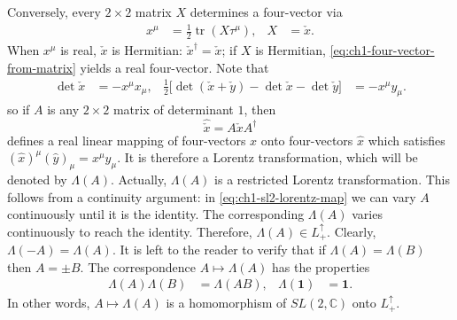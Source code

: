 Conversely, every $2\times2$ matrix $X$ determines a four-vector via
\begin{equation}
\begin{aligned}
  x^\mu&=\frac12\operatorname{tr}(X\tau^\mu),
  & X&=\check{x}.
\end{aligned}
  \tag{1-12}\label{eq:ch1-four-vector-from-matrix}
\end{equation}
When $x^\mu$ is real, $\check{x}$ is Hermitian:
$\check{x}^{\dagger}=\check{x}$; if $X$ is Hermitian, \eqref{eq:ch1-four-vector-from-matrix} yields a real
four-vector. Note that
\begin{equation}
\begin{aligned}
  \det\check{x}&=-x^\mu x_\mu,
  &
  \frac12\bigl[\det(\check{x}+\check{y})-\det\check{x}-\det\check{y}\bigr]
  &=-x^\mu y_\mu .
\end{aligned}
  \tag{1-13}\label{eq:ch1-determinant-polarization}
\end{equation}
so if $A$ is any $2\times2$ matrix of determinant $1$, then
\begin{equation}
  \widehat{\check{x}}=A\check{x}A^\dagger
  \tag{1-14}\label{eq:ch1-sl2-lorentz-map}
\end{equation}
defines a real linear mapping of four-vectors $x$ onto four-vectors
$\widehat{x}$ which satisfies
$(\widehat{x})^\mu(\widehat{y})_\mu=x^\mu y_\mu$. It is therefore a Lorentz
transformation, which will be denoted by $\Lambda(A)$. Actually,
$\Lambda(A)$ is a restricted Lorentz transformation. This follows from a
continuity argument: in \eqref{eq:ch1-sl2-lorentz-map} we can vary $A$ continuously until it is the
identity. The corresponding $\Lambda(A)$ varies continuously to reach the
identity. Therefore, $\Lambda(A)\in L^\uparrow_+$. Clearly,
$\Lambda(-A)=\Lambda(A)$. It is left to the reader to verify that if
$\Lambda(A)=\Lambda(B)$ then $A=\pm B$. The correspondence
$A\longmapsto\Lambda(A)$ has the properties
\begin{equation}
\begin{aligned}
  \Lambda(A)\Lambda(B)&=\Lambda(AB),
  & \Lambda(\mathbf{1})&=\mathbf{1}.
\end{aligned}
  \tag{1-15}\label{eq:ch1-sl2-homomorphism}
\end{equation}
In other words, $A\longmapsto\Lambda(A)$ is a homomorphism of
$SL(2,\mathbb C)$ onto $L^\uparrow_+$.

